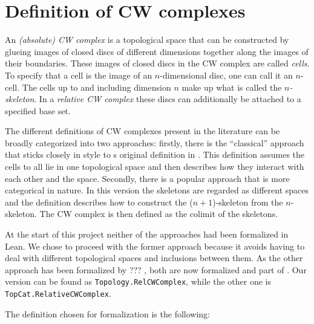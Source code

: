 \section{Definition of CW complexes}

An \emph{(absolute) CW complex} is a topological space that can be constructed by glueing images of closed discs of different dimensions together along the images of their boundaries. 
These images of closed discs in the CW complex are called \emph{cells}.
To specify that a cell is the image of an $n$-dimensional disc, one can call it an $n$-cell.
The cells up to and including dimension $n$ make up what is called the \emph{$n$-skeleton}.
In a \emph{relative CW complex} these discs can additionally be attached to a specified base set. 

The different definitions of CW complexes present in the literature can be broadly categorized into two approaches: firstly, there is the ``classical'' approach that sticks closely in style to \citeauthor{Whitehead2018}s original definition in \cite{Whitehead2018}.
This definition assumes the cells to all lie in one topological space and then describes how they interact with each other and the space.
Secondly, there is a popular approach that is more categorical in nature. 
In this version the skeletons are regarded as different spaces and the definition describes how to construct the ($n+1$)-skeleton from the $n$-skeleton. 
The CW complex is then defined as the colimit of the skeletons. 

At the start of this project neither of the approaches had been formalized in Lean. 
We chose to proceed with the former approach because it avoids having to deal with different topological spaces and inclusions between them. 
As the other approach has been formalized by ??? , both are now formalized and part of \mathlib. 
Our version can be found as \lstinline|Topology.RelCWComplex|, while the other one is \lstinline|TopCat.RelativeCWComplex|.

The definition chosen for formalization is the following: 

